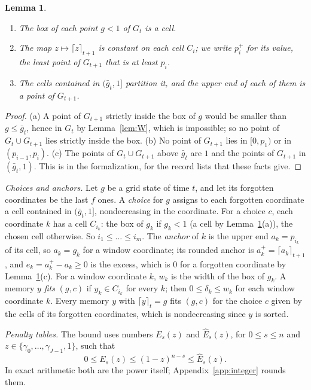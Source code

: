 \documentclass[11pt]{amsart}
\newtheorem{lemma}[theorem]{Lemma}
\theoremstyle{definition}
\numberwithin{equation}{section}
\newcommand{\lean}[1]{\ignorespaces}
\newcommand{\ceil}[2]{\lceil #1\rceil_{#2}}
\begin{document}
\begin{lemma}\label{lem:cells}\lean{Robbins.Cert.SO.recList_ok, Robbins.Cert.SO.fits_choice}
\begin{enumerate}[label=(\alph*)]
\item The box of each point $g<1$ of $G_t$ is a cell.
\item The map $z\mapsto\ceil{z}{t+1}$ is constant on each cell $C_i$; we write $p_i^+$ for its value, the least point of $G_{t+1}$ that is at least $p_i$.
\item The cells contained in $(\bar g_t,1]$ partition it, and the upper end of each of them is a point of $G_{t+1}$.
\end{enumerate}
\end{lemma}

\begin{proof}
(a) A point of $G_{t+1}$ strictly inside the box of $g$ would be smaller than $g\le\bar g_t$, hence in $G_t$ by Lemma~\ref{lem:W}, which is impossible; so no point of $G_t\cup G_{t+1}$ lies strictly inside the box. (b) No point of $G_{t+1}$ lies in $[0,p_1)$ or in $(p_{i-1},p_i)$. (c) The points of $G_t\cup G_{t+1}$ above $\bar g_t$ are $1$ and the points of $G_{t+1}$ in $(\bar g_t,1)$. This is  in the formalization, for the record lists that these facts give.
\end{proof}

\emph{Choices and anchors.} Let $g$ be a grid state of time $t$, and let its forgotten coordinates be the last $f$ ones. A \emph{choice} for $g$ assigns to each forgotten coordinate a cell contained in $(\bar g_t,1]$, nondecreasing in the coordinate. For a choice $c$, each coordinate $k$ has a cell $C_{i_k}$: the box of $g_k$ if $g_k<1$ (a cell by Lemma~\ref{lem:cells}(a)), the chosen cell otherwise. So $i_1\le\dots\le i_m$. The \emph{anchor} of $k$ is the upper end $a_k=p_{i_k}$ of its cell, so $a_k=g_k$ for a window coordinate; its rounded anchor is $a_k^+=\ceil{a_k}{t+1}$, and $e_k=a_k^+-a_k\ge0$ is the excess, which is $0$ for a forgotten coordinate by Lemma~\ref{lem:cells}(c). For a window coordinate $k$, $w_k$ is the width of the box of $g_k$. A memory $y$ \emph{fits} $(g,c)$ if $y_k\in C_{i_k}$ for every $k$; then $0\le\delta_k\le w_k$ for each window coordinate $k$. Every memory $y$ with $\ceil{y}{t}=g$ fits $(g,c)$ for the choice $c$ given by the cells of its forgotten coordinates, which is nondecreasing since $y$ is sorted.

\emph{Penalty tables.} The bound uses numbers $E_s(z)$ and $\hat E_s(z)$, for $0\le s\le n$ and $z\in\{\gamma_0,\dots,\gamma_{J-1},1\}$, such that
\begin{equation}\label{eq:Etables}
0\le E_s(z)\le(1-z)^{n-s}\le\hat E_s(z).
\end{equation}
In exact arithmetic both are the power itself; Appendix~\ref{app:integer} rounds them.
\end{document}
